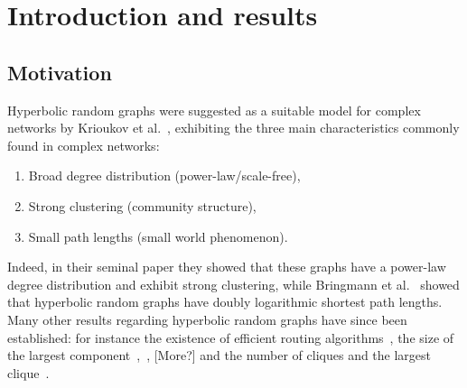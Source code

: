 \section{Introduction and results}

\subsection{Motivation}


Hyperbolic random graphs were suggested as a suitable model for complex networks by Krioukov et al.~\cite{krioukov2010hyperbolic}, exhibiting the three main characteristics commonly found in complex networks: 
\begin{enumerate}[\upshape 1)]
\item Broad degree distribution (power-law/scale-free),
\item Strong clustering (community structure),
\item Small path lengths (small world phenomenon).
\end{enumerate}
Indeed, in their seminal paper they showed that these graphs have a power-law degree distribution and exhibit strong clustering, while Bringmann et al.~\cite{bringmann2016average} showed that hyperbolic random graphs have doubly logarithmic shortest path lengths. Many other results regarding hyperbolic random graphs have since been established: for instance the existence of efficient routing algorithms~\cite{bringmann2017greedy}, the size of the largest component~\cite{bode2015largest},~\cite{fountoulakis2018law}, [More?] and the number of cliques and the largest clique~\cite{blasius2018cliques}.

